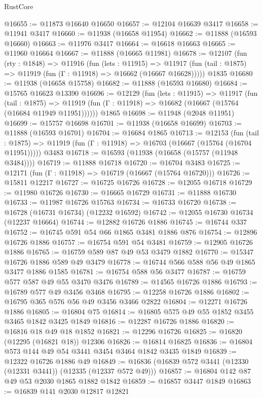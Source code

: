 \begin{lexlean}{RustCore}
\begin{coremodule}
@16655 := @11873 @16640 @16650
@16657 := @12104 @16639 @3417
@16658 := @11941 @3417
@16660 := @11938 (@16658 @11954)
@16662 := @11888 (@16593 @16660)
@16663 := @11976 @3417
@16664 := @16618 @16663
@16665 := @11960 @16664
@16667 := @11888 (@16665 @11981)
@16678 := @12107
    (fun (rty : @1848) =>
    @11916
      (fun (lets : @11915) =>
      @11917 (fun (tail : @1875) => @11919 (fun (Γ : @11918) => @16662 (@16667 @16628)))))
    @1835
@16680 := @11938 (@16658 @15758)
@16682 := @11888 (@16593 @16680)
@16684 := @15765 @16623 @13390
@16696 := @12129
    (fun (lets : @11915) =>
    @11917
      (fun (tail : @1875) =>
      @11919 (fun (Γ : @11918) => @16682 (@16667 (@15764 (@16684 @11949 @11951))))))
    @1865
@16698 := @11948 (@2048 @11951)
@16699 := @15757 @16698
@16701 := @11938 (@16658 @16699)
@16703 := @11888 (@16593 @16701)
@16704 := @16684 @1865
@16713 := @12153
    (fun (tail : @1875) => @11919 (fun (Γ : @11918) => @16703 (@16667 (@15764 (@16704 @11951)))))
    @3483
@16718 := @16593 (@11938 (@16658 (@15757 (@11948 @3484))))
@16719 := @11888 @16718
@16720 := @16704 @3483
@16725 := @12171 (fun (Γ : @11918) => @16719 (@16667 (@15764 @16720)))
@16726 := @15811 @12217
@16727 := @16725 @16726
@16728 := @12055 @16718
@16729 := @11980 @16726
@16730 := @16665 @16729
@16731 := @11888 @16730
@16733 := @11987 @16726 @15763
@16734 := @16733 @16720
@16738 := @16728 (@16731 @16734) (@12232 @16592)
@16742 := @12055 @16730 @16734 (@12237 @16664)
@16744 := @12882 @16726 @1886
@16745 := @16744 @337
@16752 := @16745 @591 @54 @66 @1865 @3481 @1886 @876
@16754 := @12896 @16726 @1886
@16757 := @16754 @591 @54 @3481
@16759 := @12905 @16726 @1886
@16765 := @16759 @589 @87 @49 @53 @3479 @1882
@16770 := @15347 @16726 @1886 @589 @49 @3479
@16778 := @16744 @566 @588 @56 @49 @1865 @3477 @1886 @1585
@16781 := @16754 @588 @56 @3477
@16787 := @16759 @577 @587 @49 @55 @3470 @3476
@16789 := @14565 @16726 @1886
@16793 := @16789 @577 @49 @3456 @3468
@16795 := @12258 @16726 @1886
@16802 := @16795 @365 @576 @56 @49 @3456 @3466 @2822
@16804 := @12271 @16726 @1886
@16805 := @16804 @75
@16814 := @16805 @575 @49 @55 @1852 @3455 @3465 @1842 @3425 @1849
@16816 := @12287 @16726 @1886
@16820 := @16816 @18 @49 @18 @1852
@16821 := @12296 @16726
@16825 := @16820 (@12295 (@16821 @18)) @12306
@16826 := @16814 @16825
@16836 := @16804 @573 @144 @49 @54 @3441 @3454 @3464 @1842 @3435 @1849
@16839 := @12322 @16726 @1886 @49
@16849 := @16836 (@16839 @572 @3441 (@12330 (@12331 @3441)) (@12335 (@12337 @572 @49)))
@16857 := @16804 @142 @87 @49 @53 @2030 @1865 @1882 @1842
@16859 := @16857 @3447 @1849
@16863 := @16839 @141 @2030 @12817 @12821

\end{coremodule}
\end{lexlean}

